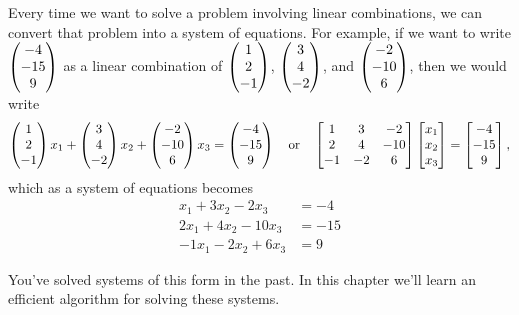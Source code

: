 \mysubsection{\ideagau}

Every time we want to solve a problem involving linear combinations, we can convert that problem into a system of equations.
For example, if we want to write $\begin{pmatrix} -4\\-15\\9 \end{pmatrix}$ as a linear combination of $\begin{pmatrix} 1\\2\\-1 \end{pmatrix}$, $\begin{pmatrix} 3\\4\\-2 \end{pmatrix}$, and $\begin{pmatrix} -2\\-10\\6 \end{pmatrix}$, then we would write 
$$ 
\begin{pmatrix} 1\\2\\-1 \end{pmatrix}x_1+\begin{pmatrix} 3\\4\\-2 \end{pmatrix}x_2+\begin{pmatrix} -2\\-10\\6 \end{pmatrix}x_3=\begin{pmatrix} -4\\-15\\9 \end{pmatrix}
\quad \text{or}\quad
\begin{bmatrix} \begin{matrix} 1\\2\\-1 \end{matrix}&\begin{matrix} 3\\4\\-2 \end{matrix}&\begin{matrix} -2\\-10\\6 \end{matrix} \end{bmatrix}\begin{bmatrix} x_1\\x_2\\x_3 \end{bmatrix}=\begin{bmatrix} -4\\-15\\9 \end{bmatrix},
$$
which as a system of equations becomes
\begin{align*}
x_1+3x_2-2x_3&=-4 \\
2x_1+4x_2-10x_3&=-15 \\
-1x_1-2x_2+6x_3&=9 
\end{align*}

You've solved systems of this form in the past. In this chapter we'll learn an efficient algorithm for solving these systems.

